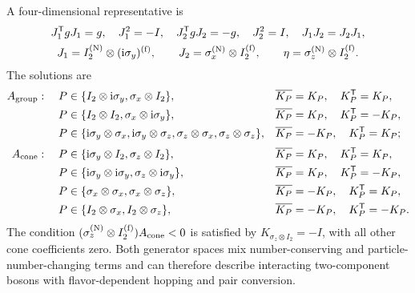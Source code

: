 A four-dimensional representative is
\begin{equation}
\begin{gathered}
J_1^{\mathsf{T}} gJ_1=g,\quad J_1^2=-I,\quad
J_2^{\mathsf{T}} gJ_2=-g,\quad J_2^2=I,\quad
J_1J_2=J_2J_1,\\
J_1=I_2^{({\rm N})}\otimes(\mathrm{i}\sigma_y)^{({\rm f})},\qquad
J_2=\sigma_x^{({\rm N})}\otimes I_2^{({\rm f})},\qquad
\eta=\sigma_z^{({\rm N})}\otimes I_2^{({\rm f})}.
\end{gathered}
\end{equation}
The solutions are
\begin{align*}
A_{\rm group}:\quad
P&\in\{I_2\otimes\mathrm{i}\sigma_y,\sigma_x\otimes I_2\},
&&\overline{K_P}=K_P,\quad K_P^{\mathsf{T}}=K_P,\\
P&\in\{I_2\otimes I_2,\sigma_x\otimes\mathrm{i}\sigma_y\},
&&\overline{K_P}=K_P,\quad K_P^{\mathsf{T}}=-K_P,\\
P&\in\{\mathrm{i}\sigma_y\otimes\sigma_x,\mathrm{i}\sigma_y\otimes\sigma_z,
\sigma_z\otimes\sigma_x,\sigma_z\otimes\sigma_z\},
&&\overline{K_P}=-K_P,\quad K_P^{\mathsf{T}}=K_P;\\[2pt]
A_{\rm cone}:\quad
P&\in\{\mathrm{i}\sigma_y\otimes I_2,\sigma_z\otimes I_2\},
&&\overline{K_P}=K_P,\quad K_P^{\mathsf{T}}=K_P,\\
P&\in\{\mathrm{i}\sigma_y\otimes\mathrm{i}\sigma_y,\sigma_z\otimes\mathrm{i}\sigma_y\},
&&\overline{K_P}=K_P,\quad K_P^{\mathsf{T}}=-K_P,\\
P&\in\{\sigma_x\otimes\sigma_x,\sigma_x\otimes\sigma_z\},
&&\overline{K_P}=-K_P,\quad K_P^{\mathsf{T}}=K_P,\\
P&\in\{I_2\otimes\sigma_x,I_2\otimes\sigma_z\},
&&\overline{K_P}=-K_P,\quad K_P^{\mathsf{T}}=-K_P.
\end{align*}
The condition \((\sigma_z^{({\rm N})}\otimes I_2^{({\rm f})})A_{\rm cone}<0\) is satisfied by
\(K_{\sigma_z\otimes I_2}=-I\), with all other cone coefficients zero.  Both generator spaces mix number-conserving and particle-number-changing terms and can therefore describe interacting two-component bosons with flavor-dependent hopping and pair conversion.

